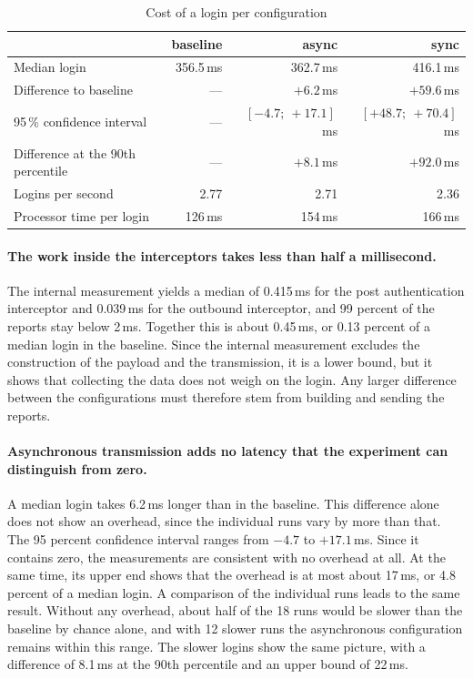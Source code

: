 \documentclass[../main.tex]{subfiles}
\begin{document}
\begin{table}[h]
\centering
\caption{Cost of a login per configuration}\label{tab:overhead-cost}
\small
\begin{tabular}{lrrr}
\toprule
 & baseline & async & sync \\
\midrule
Median login                       & 356.5\,ms & 362.7\,ms             & 416.1\,ms \\
Difference to baseline             & ---       & $+6.2$\,ms            & $+59.6$\,ms \\
95\,\% confidence interval         & ---       & $[-4.7;\ +17.1]$\,ms  & $[+48.7;\ +70.4]$\,ms \\
Difference at the 90th percentile  & ---       & $+8.1$\,ms            & $+92.0$\,ms \\
Logins per second                  & 2.77      & 2.71                  & 2.36 \\
Processor time per login           & 126\,ms   & 154\,ms               & 166\,ms \\
\bottomrule
\end{tabular}
\end{table}

\paragraph{The work inside the interceptors takes less than half a millisecond.}
The internal measurement yields a median of 0.415\,ms for the post authentication interceptor and 
0.039\,ms for the outbound interceptor, and 99 percent of the reports stay below 2\,ms.  
Together this is about 0.45\,ms, or 0.13 percent of a median login in the baseline. 
Since the internal measurement excludes the construction of the payload and the transmission, it is 
a lower bound, but it shows that collecting the data does not weigh on the login. 
Any larger difference between the configurations must therefore stem from building and sending the reports. 

\paragraph{Asynchronous transmission adds no latency that the experiment can distinguish from zero.}
A median login takes 6.2\,ms longer than in the baseline. 
This difference alone does not show an overhead, since the individual runs vary by more than that. 
The 95 percent confidence interval ranges from $-4.7$ to $+17.1$\,ms. 
Since it contains zero, the measurements are consistent with no overhead at all. 
At the same time, its upper end shows that the overhead is at most about 17\,ms, or 4.8 percent 
of a median login. 
A comparison of the individual runs leads to the same result. 
Without any overhead, about half of the 18 runs would be slower than the baseline by chance alone, 
and with 12 slower runs the asynchronous configuration remains within this range. 
The slower logins show the same picture, with a difference of 8.1\,ms at the 90th percentile and an 
upper bound of 22\,ms. 
\end{document}
